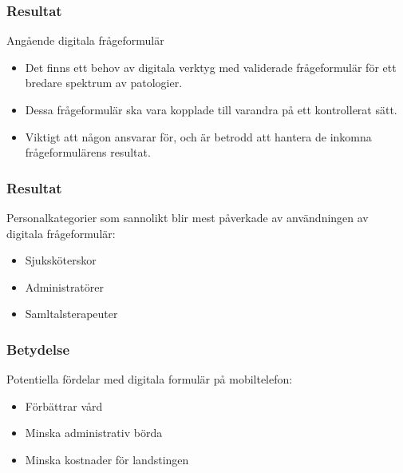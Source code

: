 \documentclass[english]{beamer}
\begin{document}
\begin{frame}
\frametitle{Resultat}
Angående digitala frågeformulär
\begin{itemize}
\item Det finns ett behov av digitala verktyg med validerade frågeformulär för ett bredare spektrum av patologier.
\item  Dessa frågeformulär ska vara kopplade till varandra på ett kontrollerat sätt. 
\item  Viktigt att någon ansvarar för, och är betrodd att hantera de inkomna frågeformulärens resultat. 
\end{itemize}
\end{frame}

\begin{frame}
\frametitle{Resultat}
Personalkategorier som sannolikt blir mest påverkade av användningen av digitala frågeformulär:
\begin{itemize}\vspace{-.33em}
\item Sjuksköterskor
\item Administratörer
\item Samltalsterapeuter

\end{itemize}
\end{frame}


\begin{frame}
\frametitle{Betydelse}
Potentiella fördelar med digitala formulär på mobiltelefon:
\begin{itemize}\vspace{-.33em}
\item Förbättrar vård
\item Minska administrativ börda
\item Minska kostnader för landstingen
\end{itemize}
\end{frame}
\end{document}
